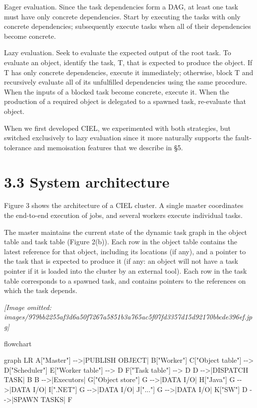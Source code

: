 \documentclass[
]{article}
\newenvironment{Shaded}{}{}
\newcommand{\NormalTok}[1]{#1}
\begin{document}
Eager evaluation. Since the task dependencies form a DAG, at least one
task must have only concrete dependencies. Start by executing the tasks
with only concrete dependencies; subsequently execute tasks when all of
their dependencies become concrete.

Lazy evaluation. Seek to evaluate the expected output of the root task.
To evaluate an object, identify the task, T, that is expected to produce
the object. If T has only concrete dependencies, execute it immediately;
otherwise, block T and recursively evaluate all of its unfulfilled
dependencies using the same procedure. When the inputs of a blocked task
become concrete, execute it. When the production of a required object is
delegated to a spawned task, re-evaluate that object.

When we first developed CIEL, we experimented with both strategies, but
switched exclusively to lazy evaluation since it more naturally supports
the fault-tolerance and memoisation features that we describe in §5.

\section{3.3 System architecture}\label{system-architecture}

Figure 3 shows the architecture of a CIEL cluster. A single master
coordinates the end-to-end execution of jobs, and several workers
execute individual tasks.

The master maintains the current state of the dynamic task graph in the
object table and task table (Figure 2(b)). Each row in the object table
contains the latest reference for that object, including its locations
(if any), and a pointer to the task that is expected to produce it (if
any: an object will not have a task pointer if it is loaded into the
cluster by an external tool). Each row in the task table corresponds to
a spawned task, and contains pointers to the references on which the
task depends.

\textit{[Image omitted: images/979bb2255af3d6a50f7267a5851b3a765ac5f07fd3357d15d92170bbcde396ef.jpg]}

flowchart

\begin{Shaded}
\begin{Highlighting}[]
\NormalTok{graph LR}
\NormalTok{    A["Master"] {-}{-}\textgreater{}|PUBLISH OBJECT| B["Worker"]}
\NormalTok{    C["Object table"] {-}{-}\textgreater{} D["Scheduler"]}
\NormalTok{    E["Worker table"] {-}{-}\textgreater{} D}
\NormalTok{    F["Task table"] {-}{-}\textgreater{} D}
\NormalTok{    D {-}{-}\textgreater{}|DISPATCH TASK| B}
\NormalTok{    B {-}{-}\textgreater{}|Executors| G["Object store"]}
\NormalTok{    G {-}{-}\textgreater{}|DATA I/O| H["Java"]}
\NormalTok{    G {-}{-}\textgreater{}|DATA I/O| I[".NET"]}
\NormalTok{    G {-}{-}\textgreater{}|DATA I/O| J["..."]}
\NormalTok{    G {-}{-}\textgreater{}|DATA I/O| K["SW"]}
\NormalTok{    D {-}{-}\textgreater{}|SPAWN TASKS| F}
\end{Highlighting}
\end{Shaded}
\end{document}

